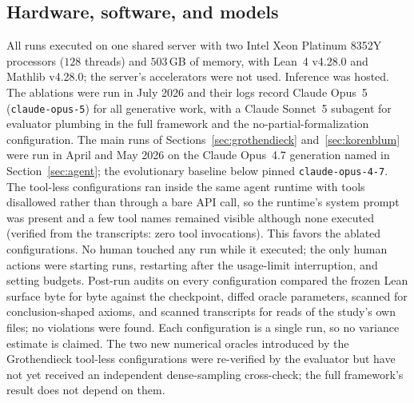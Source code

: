 \subsection{Hardware, software, and models}

All runs executed on one shared server with two Intel Xeon Platinum 8352Y
processors ($128$ threads) and $503$\,GB of memory, with Lean~4 v4.28.0 and
Mathlib v4.28.0; the server's accelerators were not used. Inference was hosted.
The ablations were run in July 2026 and their logs record Claude Opus~5
(\texttt{claude-opus-5}) for all generative work, with a Claude Sonnet~5
subagent for evaluator plumbing in the full framework and the
no-partial-formalization configuration. The main runs of
Sections~\ref{sec:grothendieck} and~\ref{sec:korenblum} were run in April and
May 2026 on the Claude Opus~4.7 generation named in Section~\ref{sec:agent};
the evolutionary baseline below pinned \texttt{claude-opus-4-7}. The tool-less configurations
ran inside the same agent runtime with tools disallowed rather than through a
bare API call, so the runtime's system prompt was present and a few tool names
remained visible although none executed (verified from the transcripts: zero
tool invocations). This favors the ablated configurations. No human touched any
run while it executed; the only human actions were starting runs, restarting
after the usage-limit interruption, and setting budgets. Post-run audits on
every configuration compared the frozen Lean surface byte for byte against the
checkpoint, diffed oracle parameters, scanned for conclusion-shaped axioms, and
scanned transcripts for reads of the study's own files; no violations were
found. Each configuration is a single run, so no variance estimate is claimed.
The two new numerical oracles introduced by the Grothendieck tool-less
configurations were re-verified by the evaluator but have not yet received an
independent dense-sampling cross-check; the full framework's result does not
depend on them.
